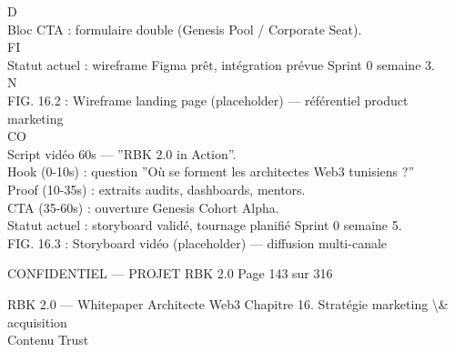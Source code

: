 \documentclass[12pt,landscape,a4paper]{article}
\newenvironment{confidential}
{\begin{tcolorbox}[
    colback=rbkred!5!white,
    colframe=rbkred!75!black,
    title=CONFIDENTIEL,
    fonttitle=\bfseries\color{white},
    coltitle=rbkred!75!black,
    breakable,
    enhanced,
    frame hidden,
    borderline west={2pt}{0pt}{rbkred!75!black}
]}
{\end{tcolorbox}}
\begin{document}
\vspace{0.5em}
\vspace{0.5em}
\vspace{0.5em}
\vspace{0.5em}
D\\
Bloc CTA : formulaire double (Genesis Pool / Corporate Seat).\\
\vspace{0.5em}
\vspace{0.5em}
\vspace{0.5em}
\vspace{0.5em}
FI\\
Statut actuel : wireframe Figma prêt, intégration prévue Sprint 0 semaine 3.\\
\vspace{0.5em}
\vspace{0.5em}
N\\
FIG. 16.2 : Wireframe landing page (placeholder) — référentiel product marketing\\
CO\\
Script vidéo 60s — ”RBK 2.0 in Action”.\\
Hook (0-10s) : question ”Où se forment les architectes Web3 tunisiens ?”\\
Proof (10-35s) : extraits audits, dashboards, mentors.\\
CTA (35-60s) : ouverture Genesis Cohort Alpha.\\
Statut actuel : storyboard validé, tournage planifié Sprint 0 semaine 5.\\
\vspace{0.5em}
FIG. 16.3 : Storyboard vidéo (placeholder) — diffusion multi-canale\\
\vspace{0.5em}
\vspace{0.5em}
\vspace{0.5em}
\vspace{0.5em}
\begin{confidential}CONFIDENTIEL — PROJET RBK 2.0                                         Page 143 sur 316\end{confidential}
RBK 2.0 — Whitepaper Architecte Web3                                                        Chapitre 16. Stratégie marketing \textbackslash{}& acquisition\\
\vspace{0.5em}
\vspace{0.5em}
\vspace{0.5em}
\vspace{0.5em}
Contenu           Trust\\
\end{document}
